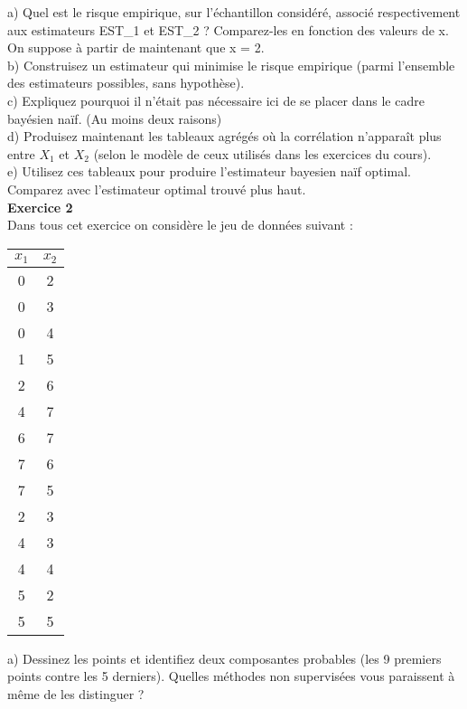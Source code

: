 \documentclass[a4paper]{article}
\begin{document}
a) Quel est le risque empirique, sur l'échantillon considéré, associé respectivement aux estimateurs EST\_1 et EST\_2 ? Comparez-les en fonction des valeurs de x.\\

On suppose à partir de maintenant que x = 2.\\

b) Construisez un estimateur qui minimise le risque empirique (parmi l'ensemble des estimateurs possibles, sans hypothèse).\\

c) Expliquez pourquoi il n'était pas nécessaire ici de se placer dans le cadre bayésien naïf. (Au moins deux raisons)\\

d) Produisez maintenant les tableaux agrégés où la corrélation n'apparaît plus entre $X_1$ et $X_2$ (selon le modèle de ceux utilisés dans les exercices du cours).\\

e) Utilisez ces tableaux pour produire l'estimateur bayesien naïf optimal. Comparez avec l'estimateur optimal trouvé plus haut.\\


\textbf{Exercice 2}\\

Dans tous cet exercice on considère le jeu de données suivant :

\begin{center}
\vspace{0.2cm}
\begin{tabular}{|c|c|}
\hline
$x_1$ & $x_2$\\
\hline
0 & 2 \\
0 & 3 \\
0 & 4 \\
1 & 5 \\
2 & 6 \\
4 & 7 \\
6 & 7 \\
7 & 6 \\
7 & 5 \\
2 & 3 \\
4 & 3 \\
4 & 4 \\
5 & 2 \\
5 & 5 \\
\hline
\end{tabular}
\end{center}

a) Dessinez les points et identifiez deux composantes probables (les 9 premiers points contre les 5 derniers). Quelles méthodes non supervisées vous paraissent à même de les distinguer ?\\
\end{document}
